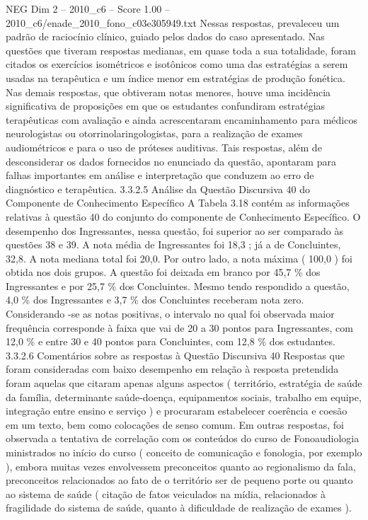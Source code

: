 \begin{textsample}{NEG Dim 2 – 2010\_c6 – Score 1.00 – 2010\_c6/enade\_2010\_fono\_c03e305949.txt}
Nessas respostas, prevaleceu um padrão de raciocínio clínico, guiado pelos dados do caso apresentado.
Nas questões que tiveram respostas medianas, em quase toda a sua totalidade, foram citados os exercícios isométricos e isotônicos como uma das estratégias a serem usadas na terapêutica e um índice menor em estratégias de produção fonética.
Nas demais respostas, que obtiveram notas menores, houve uma incidência significativa de proposições em que os estudantes confundiram estratégias terapêuticas com avaliação e ainda acrescentaram encaminhamento para médicos neurologistas ou otorrinolaringologistas, para a realização de exames audiométricos e para o uso de próteses auditivas.
Tais respostas, além de desconsiderar os dados fornecidos no enunciado da questão, apontaram para falhas importantes em análise e interpretação que conduzem ao erro de diagnóstico e terapêutica. 3.3.2.5 Análise da Questão Discursiva 40 do Componente de Conhecimento Específico A Tabela 3.18 contém as informações relativas à questão 40 do conjunto do componente de Conhecimento Específico.
O desempenho dos Ingressantes, nessa questão, foi superior ao ser comparado às questões 38 e 39.
A nota média de Ingressantes foi 18,3 ; já a de Concluintes, 32,8.
A nota mediana total foi 20,0.
Por outro lado, a nota máxima ( 100,0 ) foi obtida nos dois grupos.
A questão foi deixada em branco por 45,7 \% dos Ingressantes e por 25,7 \% dos Concluintes.
Mesmo tendo respondido a questão, 4,0 \% dos Ingressantes e 3,7 \% dos Concluintes receberam nota zero.
Considerando -se as notas positivas, o intervalo no qual foi observada maior frequência corresponde à faixa que vai de 20 a 30 pontos para Ingressantes, com 12,0 \% e entre 30 e 40 pontos para Concluintes, com 12,8 \% dos estudantes. 3.3.2.6 Comentários sobre as respostas à Questão Discursiva 40 Respostas que foram consideradas com baixo desempenho em relação à resposta pretendida foram aquelas que citaram apenas alguns aspectos ( território, estratégia de saúde da família, determinante saúde-doença, equipamentos sociais, trabalho em equipe, integração entre ensino e serviço ) e procuraram estabelecer coerência e coesão em um texto, bem como colocações de senso comum.
Em outras respostas, foi observada a tentativa de correlação com os conteúdos do curso de Fonoaudiologia ministrados no início do curso ( conceito de comunicação e fonologia, por exemplo ), embora muitas vezes envolvessem preconceitos quanto ao regionalismo da fala, preconceitos relacionados ao fato de o território ser de pequeno porte ou quanto ao sistema de saúde ( citação de fatos veiculados na mídia, relacionados à fragilidade do sistema de saúde, quanto à dificuldade de realização de exames ).

\end{textsample}
